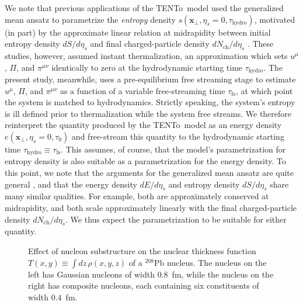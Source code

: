 \documentclass[aps,prc,reprint,amsmath,nofootinbib]{revtex4-1}
\newcommand{\trento}{T\raisebox{-0.5ex}{R}ENTo}
\newcommand{\nch}{N_\text{ch}}
\newcommand{\taufs}{\tau_\text{fs}}
\newcommand{\xv}{\mathbf x}
\begin{document}
We note that previous applications of the \trento\ model \cite{Moreland:2014oya, Bernhard:2016tnd} used the generalized mean ansatz to parametrize the \emph{entropy} density $s(\xv_\perp, \eta_s=0, \tau_\text{hydro})$, motivated (in part) by the approximate linear relation at midrapidity between initial entropy density $dS/d\eta_s$ and final charged-particle density $d\nch/d\eta_s$ \cite{Shen:2015qta}.
These studies, however, assumed instant thermalization, an approximation which sets $u^\mu$, $\Pi$, and $\pi^{\mu\nu}$ identically to zero at the hydrodynamic starting time $\tau_\text{hydro}$.
The present study, meanwhile, uses a pre-equilibrium free streaming stage to estimate $u^\mu$, $\Pi$, and $\pi^{\mu\nu}$ as a function of a variable free-streaming time $\taufs$, at which point the system is matched to hydrodynamics.
Strictly speaking, the system's entropy is ill defined prior to thermalization while the system free streams.
We therefore reinterpret the quantity produced by the \trento\ model as an energy density $e(\xv_\perp, \eta_s=0, \tau_0)$ and free-stream this quantity to the hydrodynamic starting time $\tau_\text{hydro} \equiv \taufs$.
This assumes, of course, that the model's parametrization for entropy density is also suitable as a parametrization for the energy density.
To this point, we note that the arguments for the generalized mean ansatz are quite general \cite{Moreland:2014oya}, and that the energy density $dE/d\eta_s$ and entropy density $dS/d\eta_s$ share many similar qualities.
For example, both are approximately conserved at midrapidity, and both scale approximately linearly with the final charged-particle density $d\nch/d\eta_s$.
We thus expect the parametrization to be suitable for either quantity.

\begin{figure}
  \caption{\label{fig:thickness} Effect of nucleon substructure on the nuclear thickness function $T(x, y) \equiv \int dz\, \rho(x, y, z)$ of a $^{208}\mathrm{Pb}$ nucleus. The nucleus on the left has Gaussian nucleons of width $0.8$~fm, while the nucleus on the right has composite nucleons, each containing six constituents of width $0.4$~fm.}
\end{figure}
\end{document}

